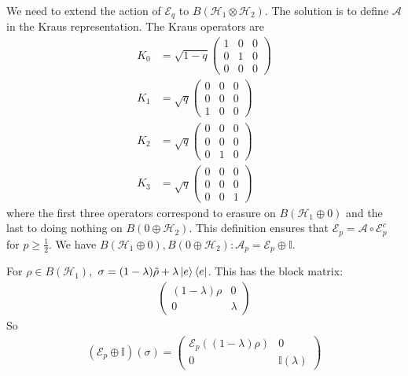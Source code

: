 \documentclass[10pt,oneside,longbibliography]{report}
\begin{document}
\begin{enumerate}
    We need to extend the action of $\mathcal{E}_q$ to $B(\mathcal{H}_1 \otimes \mathcal{H}_2)$. The solution is to define $\mathcal{A}$ in the Kraus representation. The Kraus operators are 
    \begin{align}
       K_0 &= \sqrt{1-q}\begin{pmatrix}
        1 & 0 & 0\\
        0 & 1 & 0 \\
        0 & 0 & 0
        \end{pmatrix} \\
        K_1 &= \sqrt{q}\begin{pmatrix}
        0 & 0 & 0\\
        0 & 0 & 0 \\
        1 & 0 & 0
        \end{pmatrix} \\
        K_2 &= \sqrt{q}\begin{pmatrix}
        0 & 0 & 0\\
        0 & 0 & 0 \\
        0 & 1 & 0
        \end{pmatrix} \\
        K_3 &= \sqrt{q}\begin{pmatrix}
        0 & 0 & 0\\
        0 & 0 & 0 \\
        0 & 0 & 1
        \end{pmatrix}
    \end{align}
    where the first three operators correspond to erasure on $B(\mathcal{H}_1 \oplus 0)$ and the last to doing nothing on $B(0 \oplus \mathcal{H}_2)$. This definition ensures that $\mathcal{E}_p = \mathcal{A} \circ \mathcal{E}_p^c $ for $p \geq \frac{1}{2}$.  We have $B(\mathcal{H}_1 \oplus 0), B(0\oplus \mathcal{H}_2): \mathcal{A}_p = \mathcal{E}_p \oplus \mathbb{I}$.
    
    For $\rho \in B(\mathcal{H}_1),$ $\sigma = (1-\lambda) \tilde{\rho} + \lambda \ket{e}\bra{e}$. This has the block matrix:
    \begin{align}
        \begin{pmatrix}
        (1-\lambda)\rho & 0 \\
        0 & \lambda
        \end{pmatrix}
    \end{align}
    So 
    \begin{align}
        (\mathcal{E}_p \oplus \mathbb{I})(\sigma) = \begin{pmatrix}
        \mathcal{E}_p((1-\lambda)\rho) & 0 \\
        0 & \mathbb{I}(\lambda)
        \end{pmatrix}
    \end{align}
    

\end{enumerate}
\end{document}
